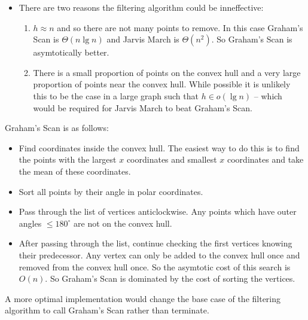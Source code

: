 \documentclass[10pt,\jkfside,a4paper]{article}
\begin{document}
\begin{enumerate}
\begin{itemize}
\item There are two reasons the filtering algorithm could be inneffective: 

\begin{enumerate}[label=Case \arabic*:]

\item $h \approx n$ and so there are not many points to remove.
In this case Graham's Scan is $\Theta(n\lg n)$ and Jarvis March is $\Theta(n^2)$. 
So Graham's Scan is asymtotically better.

\item There is a small proportion of points on the convex hull and a very large proportion 
of points near the convex hull. While possible it is unlikely this to be the case 
in a large graph such that $h \in o(\lg n)$ -- which would be required for Jarvis March to 
beat Graham's Scan.

\end{enumerate}

\end{itemize}

Graham's Scan is as follows:

\begin{itemize}

\item Find coordinates inside the convex hull. The easiest way to do this is to find the points with 
the largest $x$ coordinates and smallest $x$ coordinates and take the mean of these coordinates.

\item Sort all points by their angle in polar coordinates.

\item Pass through the list of vertices anticlockwise. Any points which have outer angles $\leq 180^\circ$ 
are not on the convex hull.

\item After passing through the list, continue checking the first vertices knowing their 
predecessor. Any vertex can only be added to the convex hull once and removed from the convex 
hull once. So the asymtotic cost of this search is $O(n)$. So Graham's Scan is dominated by 
the cost of sorting the vertices.

\end{itemize}

A more optimal implementation would change the base case of the filtering algorithm to call Graham's Scan rather than 
terminate.

\end{enumerate}
\end{document}
